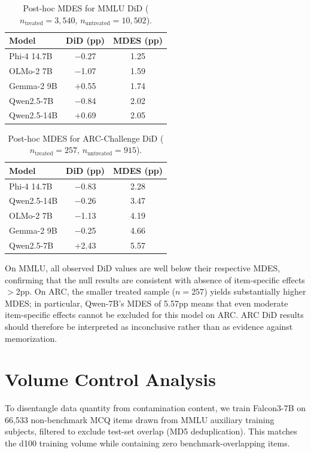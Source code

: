 \begin{table}[h]
\centering
\caption{Post-hoc MDES for MMLU DiD ($n_{\text{treated}}=3{,}540$, $n_{\text{untreated}}=10{,}502$).}
\label{tab:mdes_mmlu}
\footnotesize
\begin{tabular}{lcc}
\toprule
Model & DiD (pp) & MDES (pp) \\
\midrule
Phi-4 14.7B & $-$0.27 & 1.25 \\
OLMo-2 7B & $-$1.07 & 1.59 \\
Gemma-2 9B & $+$0.55 & 1.74 \\
Qwen2.5-7B & $-$0.84 & 2.02 \\
Qwen2.5-14B & $+$0.69 & 2.05 \\
\bottomrule
\end{tabular}
\end{table}

\begin{table}[h]
\centering
\caption{Post-hoc MDES for ARC-Challenge DiD ($n_{\text{treated}}=257$, $n_{\text{untreated}}=915$).}
\label{tab:mdes_arc}
\footnotesize
\begin{tabular}{lcc}
\toprule
Model & DiD (pp) & MDES (pp) \\
\midrule
Phi-4 14.7B & $-$0.83 & 2.28 \\
Qwen2.5-14B & $-$0.26 & 3.47 \\
OLMo-2 7B & $-$1.13 & 4.19 \\
Gemma-2 9B & $-$0.25 & 4.66 \\
Qwen2.5-7B & $+$2.43 & 5.57 \\
\bottomrule
\end{tabular}
\end{table}

On MMLU, all observed DiD values are well below their respective MDES, confirming that the null results are consistent with absence of item-specific effects $>$2pp. On ARC, the smaller treated sample ($n=257$) yields substantially higher MDES; in particular, Qwen-7B's MDES of 5.57pp means that even moderate item-specific effects cannot be excluded for this model on ARC. ARC DiD results should therefore be interpreted as inconclusive rather than as evidence against memorization.

\section{Volume Control Analysis}
\label{sec:volume_control}

To disentangle data quantity from contamination content, we train Falcon3-7B on 66{,}533 non-benchmark MCQ items drawn from MMLU auxiliary training subjects, filtered to exclude test-set overlap (MD5 deduplication). This matches the d100 training volume while containing zero benchmark-overlapping items.

